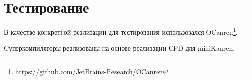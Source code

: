 \section{Тестирование}

В качестве конкретной реализации \ukanren для тестирования
использовался OCanren\footnote{https://github.com/JetBrains-Research/OCanren}.

Cуперкомпиляторы реализованы на основе реализации CPD для miniKanren.
